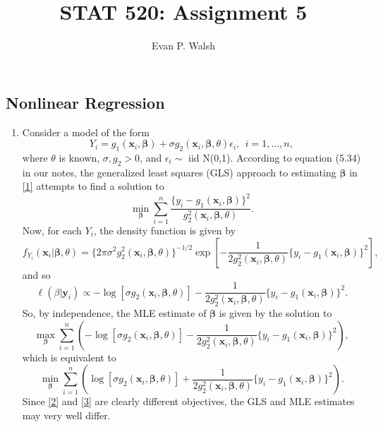 \documentclass[12pt]{article}
\title{STAT 520: Assignment 5}
\author{Evan P. Walsh}
\begin{document}

\subsection*{Nonlinear Regression}

\begin{enumerate}

  \item Consider a model of the form
    \begin{equation}
      Y_{i} = g_1(\bm{x}_i, \bm{\beta}) + \sigma g_2(\bm{x}_i, \bm{\beta}, \theta) \epsilon_i, \ \ i = 1,\dots, n,
      \label{1}
    \end{equation}
    where $\theta$ is known, $\sigma, g_2 > 0$, and $\epsilon_i \sim$ iid N(0,1). According to equation (5.34) in our notes,
    the generalized least squares (GLS) approach to estimating $\bm{\beta}$ in \eqref{1} attempts to find a solution to
    \begin{equation}
      \min_{\bm{\beta}}\sum_{i=1}^{n}\frac{\{y_i - g_1(\bm{x}_i, \bm{\beta})\}^{2}}{g_{2}^{2}(\bm{x}_i,\bm{\beta},\theta)}.
      \label{2}
    \end{equation}
    Now, for each $Y_{i}$, the density function is given by 
    \[
      f_{Y_i}(\bm{x}_i|\bm{\beta},\theta) = \{2\pi\sigma^{2}g_{2}^{2}(\bm{x}_i,\bm{\beta},\theta)\}^{-1/2}\exp\left[ 
      -\frac{1}{2g_{2}^{2}(\bm{x}_i,\bm{\beta},\theta)}\{y_i - g_1(\bm{x}_i,\bm{\beta})\}^{2}\right],
    \]
    and so
    \[
      \ell(\beta|\bm{y}_i) \propto -\log\left[\sigma g_{2}(\bm{x}_i,\bm{\beta},\theta)\right] - \frac{1}{2g_{2}^{2}(\bm{x}_i,\bm{\beta},\theta)}\{y_i -
      g_{1}(\bm{x}_i,\bm{\beta})\}^{2}.
    \]
    So, by independence, the MLE estimate of $\bm{\beta}$ is given by the solution to 
    \[
      \max_{\bm{\beta}}\sum_{i=1}^{n}\left(-\log\left[\sigma g_{2}(\bm{x}_i,\bm{\beta},\theta)\right] - \frac{1}{2g_{2}^{2}(\bm{x}_i,\bm{\beta},\theta)}\{y_i -
      g_{1}(\bm{x}_i,\bm{\beta})\}^{2}\right),
    \]
    which is equivalent to
    \begin{equation}
      \min_{\bm{\beta}}\sum_{i=1}^{n}\left(\log\left[\sigma g_{2}(\bm{x}_i,\bm{\beta},\theta)\right] + \frac{1}{2g_{2}^{2}(\bm{x}_i,\bm{\beta},\theta)}\{y_i -
      g_{1}(\bm{x}_i,\bm{\beta})\}^{2}\right).
      \label{3}
    \end{equation}
    Since \eqref{2} and \eqref{3} are clearly different objectives, the GLS and MLE estimates may very well differ.


\end{enumerate}
\end{document}
